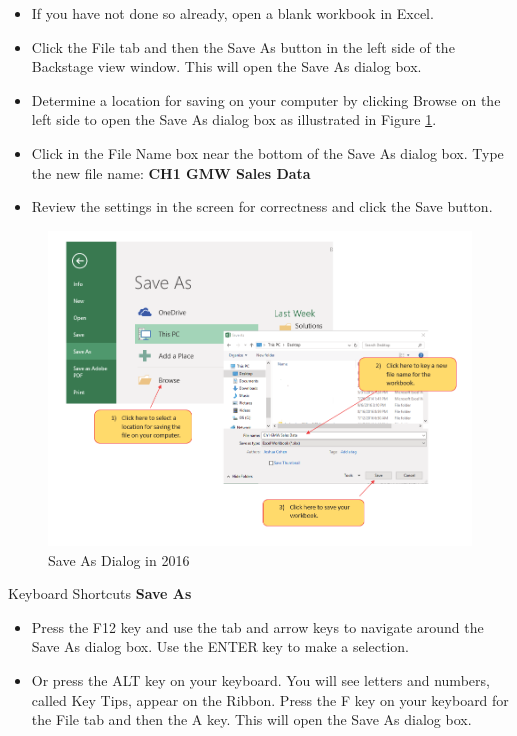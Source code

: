 \begin{itemize}
	\item If you have not done so already, open a blank workbook in Excel.
	\item Click the File tab and then the Save As button in the left side of the Backstage view window. This will open the Save As dialog box.
	\item Determine a location for saving on your computer by clicking Browse on the left side to open the Save As dialog box as illustrated in Figure \ref{01:fig12}.
	\item Click in the File Name box near the bottom of the Save As dialog box. Type the new file name: \textbf{CH1 GMW Sales Data}
	\item Review the settings in the screen for correctness and click the Save button.
\end{itemize}

\begin{figure}[H]
	\centering
	\includegraphics[width=\maxwidth{.95\linewidth}]{gfx/Ch01_fig12}
	\caption{Save As Dialog in 2016}
	\label{01:fig12}
\end{figure}

\begin{center}
	\begin{shtcutbox}{Keyboard Shortcuts}
		\textbf{Save As}
		\\
		\begin{itemize}
			\setlength{\itemsep}{0pt}
			\setlength{\parskip}{0pt}
			\setlength{\parsep}{0pt}
			
			\item Press the F12 key and use the tab and arrow keys to navigate around the Save As dialog box. Use the ENTER key to make a selection.
			\item Or press the ALT key on your keyboard. You will see letters and numbers, called Key Tips, appear on the Ribbon. Press the F key on your keyboard for the File tab and then the A key. This will open the Save As dialog box.
			
		\end{itemize}
	\end{shtcutbox}
\end{center}

